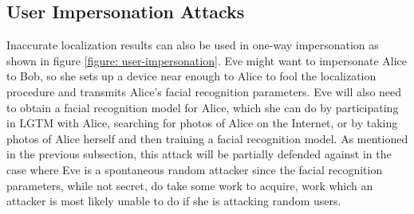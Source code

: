 \documentclass[12pt]{report}
\begin{document}
\subsection{User Impersonation Attacks}
Inaccurate localization results can also be used in one-way impersonation as shown in figure \ref{figure: user-impersonation}. Eve might want to impersonate Alice to Bob, so she sets up a device near enough to Alice to fool the localization procedure and transmits Alice's facial recognition parameters. Eve will also need to obtain a facial recognition model for Alice, which she can do by participating in LGTM with Alice, searching for photos of Alice on the Internet, or by taking photos of Alice herself and then training a facial recognition model. As mentioned in the previous subsection, this attack will be partially defended against in the case where Eve is a spontaneous random attacker since the facial recognition parameters, while not secret, do take some work to acquire, work which an attacker is most likely unable to do if she is attacking random users. \par
\end{document}
